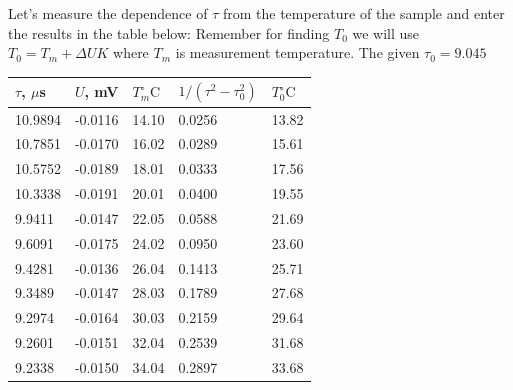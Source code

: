 \documentclass[a4paper, 12pt]{article}%
\begin{document}
Let's measure the dependence of $\tau$ from the temperature of the sample and enter the results in the table below: Remember for finding $T_0$ we will use $T_0 = T_m + \Delta UK$ where $T_m$ is measurement temperature. The given $\tau_0 = 9.045$


\begin{table}
\begin{center}
\begin{tabular}{|l|l|l|l|l|}
\hline
$\tau$, $\mu$s                          & $U$, mV                          & $T_{m}^{\circ} \mathrm{C}$      & $1 / (\tau^2 - \tau_0^2)$      & $T_0^{\circ} \mathrm{C}$      \\ \hline
10.9894                              & -0.0116                          & 14.10            & 0.0256                         & 13.82       \\ \hline
10.7851                              & -0.0170                          & 16.02            & 0.0289                         & 15.61       \\ \hline
10.5752                              & -0.0189                          & 18.01            & 0.0333                         & 17.56       \\ \hline
10.3338                              & -0.0191                          & 20.01            & 0.0400                         & 19.55       \\ \hline
9.9411                               & -0.0147                          & 22.05             & 0.0588                         & 21.69       \\ \hline
9.6091                               & -0.0175                          & 24.02            & 0.0950                         & 23.60       \\ \hline
9.4281                               & -0.0136                          & 26.04            & 0.1413                         & 25.71       \\ \hline
9.3489                               & -0.0147                          & 28.03            & 0.1789                         & 27.68       \\ \hline
9.2974                               & -0.0164                          & 30.03            & 0.2159                         & 29.64       \\ \hline
9.2601                               & -0.0151                            & 32.04            & 0.2539                         & 31.68       \\ \hline
9.2338                               & -0.0150                            & 34.04            & 0.2897                         & 33.68       \\ \hline

\end{tabular}
\end{center}
\end{table}
\end{document}

